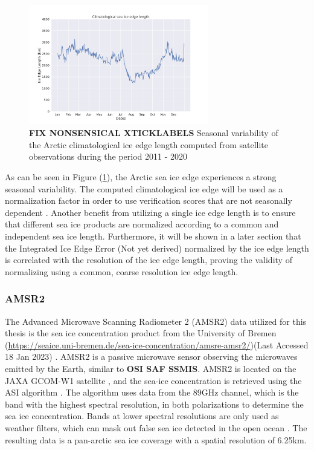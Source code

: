 \documentclass[../main/thesis.tex]{subfiles}
\begin{document}
\begin{figure}
    \centering
    \includegraphics[width = 0.7\textwidth]{clim_iceedge}
    \caption{\label{fig:clim_iceedge} \textbf{FIX NONSENSICAL XTICKLABELS} Seasonal variability of the Arctic climatological ice edge length computed from satellite observations during the period 2011 - 2020}
\end{figure}

As can be seen in Figure (\ref{fig:clim_iceedge}), the Arctic sea ice edge experiences a strong seasonal variability. The computed climatological ice edge will be used as a normalization factor in order to use verification scores that are not seasonally dependent \citep{Goessling2016, Zampieri2019, Palerme2019}. Another benefit from utilizing a single ice edge length is to ensure that different sea ice products are normalized according to a common and independent sea ice length. Furthermore, it will be shown in a later section that the Integrated Ice Edge Error \citep{Goessling2016} (Not yet derived) normalized by the ice edge length is correlated with the resolution of the ice edge length, proving the validity of normalizing using a common, coarse resolution ice edge length.

\subsubsection{AMSR2}
The Advanced Microwave Scanning Radiometer 2 (AMSR2) data utilized for this thesis is the sea ice concentration product from the University of Bremen (\url{https://seaice.uni-bremen.de/sea-ice-concentration/amsre-amsr2/})(Last Accessed 18 Jan 2023) \citep{Spreen2008}. AMSR2 is a passive microwave sensor observing the microwaves emitted by the Earth, similar to \textbf{OSI SAF SSMIS}. AMSR2 is located on the JAXA GCOM-W1 satellite \cite{Melsheimer2019}, and the sea-ice concentration is retrieved using the ASI algorithm \cite{Spreen2008}. The algorithm uses data from the 89GHz channel, which is the band with the highest spectral resolution, in both polarizations to determine the sea ice concentration. Bands at lower spectral resolutions are only used as weather filters, which can mask out false sea ice detected in the open ocean \cite{Spreen2008}. The resulting data is a pan-arctic sea ice coverage with a spatial resolution of 6.25km.
\end{document}
